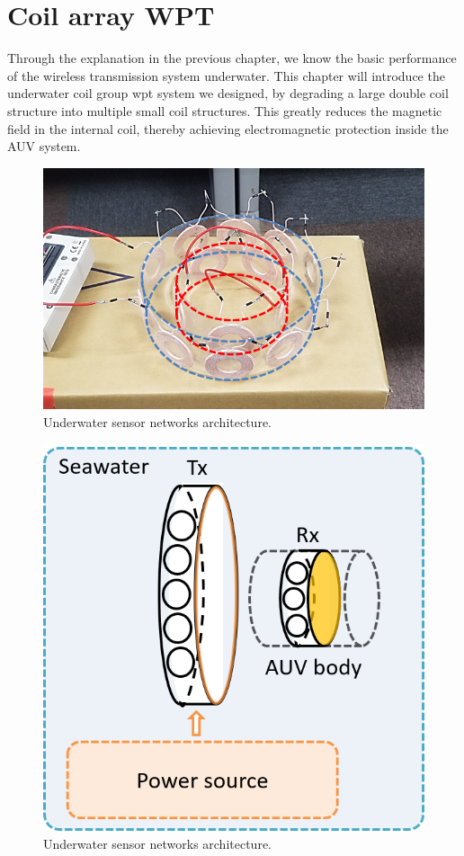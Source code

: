 \chapter{Coil array WPT}
Through the explanation in the previous chapter, we know the basic performance of the wireless transmission system underwater. This chapter will introduce the underwater coil group wpt system we designed, by degrading a large double coil structure into multiple small coil structures. This greatly reduces the magnetic field in the internal coil, thereby achieving electromagnetic protection inside the AUV system.

\begin{figure}[htbp]
    \centering
    \includegraphics[width=0.7\linewidth]{images/3_coil_array_structure.png}
    \caption{Underwater sensor networks architecture.}
    \label{fig:3_coil_array_structure}
\end{figure}


\begin{figure}[htbp]
    \centering
    \includegraphics[width=0.5\linewidth]{images/3_coil_array_uwpt.png}
    \caption{Underwater sensor networks architecture.}
    \label{fig:3_coil_array_uwpt}
\end{figure}

